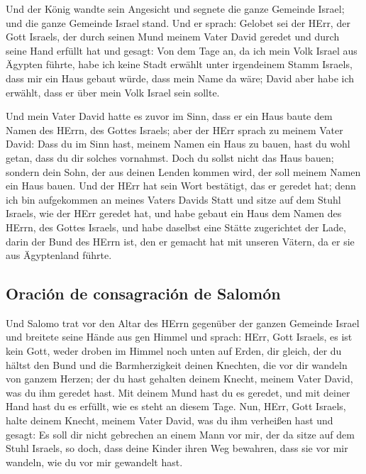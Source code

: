  Und der König wandte sein Angesicht und segnete die
ganze Gemeinde Israel; und die ganze Gemeinde Israel stand.
 Und er sprach: Gelobet sei der HErr, der Gott Israels,
der durch seinen Mund meinem Vater David geredet und durch seine Hand
erfüllt hat und gesagt:  Von dem Tage an, da ich mein
Volk Israel aus Ägypten führte, habe ich keine Stadt erwählt unter
irgendeinem Stamm Israels, dass mir ein Haus gebaut würde, dass mein
Name da wäre; David aber habe ich erwählt, dass er über mein Volk Israel
sein sollte.

 Und mein Vater David hatte es zuvor im Sinn, dass er ein
Haus baute dem Namen des HErrn, des Gottes Israels;  aber
der HErr sprach zu meinem Vater David: Dass du im Sinn hast, meinem
Namen ein Haus zu bauen, hast du wohl getan, dass du dir solches
vornahmst.  Doch du sollst nicht das Haus bauen; sondern
dein Sohn, der aus deinen Lenden kommen wird, der soll meinem Namen ein
Haus bauen.  Und der HErr hat sein Wort bestätigt, das er
geredet hat; denn ich bin aufgekommen an meines Vaters Davids Statt und
sitze auf dem Stuhl Israels, wie der HErr geredet hat, und habe gebaut
ein Haus dem Namen des HErrn, des Gottes Israels,  und
habe daselbst eine Stätte zugerichtet der Lade, darin der Bund des HErrn
ist, den er gemacht hat mit unseren Vätern, da er sie aus Ägyptenland
führte.

\hypertarget{oraciuxf3n-de-consagraciuxf3n-de-salomuxf3n}{%
\subsection{Oración de consagración de
Salomón}\label{oraciuxf3n-de-consagraciuxf3n-de-salomuxf3n}}

 Und Salomo trat vor den Altar des HErrn gegenüber der
ganzen Gemeinde Israel und breitete seine Hände aus gen Himmel
 und sprach: HErr, Gott Israels, es ist kein Gott, weder
droben im Himmel noch unten auf Erden, dir gleich, der du hältst den
Bund und die Barmherzigkeit deinen Knechten, die vor dir wandeln von
ganzem Herzen;  der du hast gehalten deinem Knecht,
meinem Vater David, was du ihm geredet hast. Mit deinem Mund hast du es
geredet, und mit deiner Hand hast du es erfüllt, wie es steht an diesem
Tage.  Nun, HErr, Gott Israels, halte deinem Knecht,
meinem Vater David, was du ihm verheißen hast und gesagt: Es soll dir
nicht gebrechen an einem Mann vor mir, der da sitze auf dem Stuhl
Israels, so doch, dass deine Kinder ihren Weg bewahren, dass sie vor mir
wandeln, wie du vor mir gewandelt hast.

